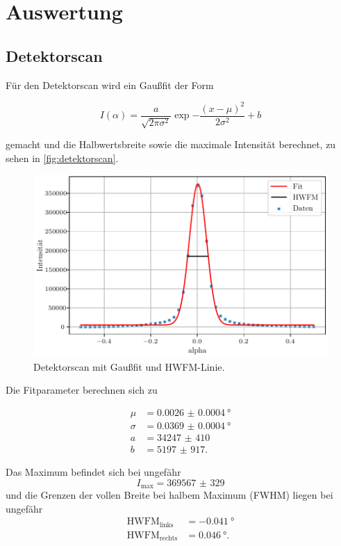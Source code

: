 \section{Auswertung}
\label{sec:Auswertung}

\subsection{Detektorscan}

Für den Detektorscan wird ein Gaußfit der Form

\begin{equation*}
    I(\alpha) = \frac{a}{\sqrt{2\pi\sigma^2}} \exp{-\frac{(x-\mu)^2}{2\sigma^2}} + b
\end{equation*}

gemacht und die Halbwertsbreite sowie die maximale Intensität berechnet, zu sehen in \autoref{fig:detektorscan}.

\begin{figure}[H]
    \centering
    \includegraphics[width=\textwidth]{plots/detectorscan.pdf}
    \caption{Detektorscan mit Gaußfit und HWFM-Linie.}
    \label{fig:detektorscan}
\end{figure}

Die Fitparameter berechnen sich zu

\begin{align*}
    \mu &= \qty{0.0026(4)}{\degree} \\
    \sigma &= \qty{0.0369(4)}{\degree} \\
    a &= \num{34247(410)} \\
    b &= \num{5197(917)}.
\end{align*}

Das Maximum befindet sich bei ungefähr
\begin{equation*}
    I_\text{max} = \num{369567(329)}
\end{equation*}
und die Grenzen der vollen Breite bei halbem Maximum (FWHM) liegen bei ungefähr
\begin{align*}
   \text{HWFM}_\text{links} &= \qty{-0.041}{\degree} \\
   \text{HWFM}_\text{rechts} &= \qty{0.046}{\degree}.
\end{align*}

